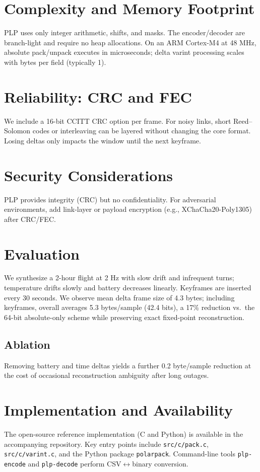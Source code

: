 \documentclass[conference]{IEEEtran}
\begin{document}
\section{Complexity and Memory Footprint}
PLP uses only integer arithmetic, shifts, and masks. The encoder/decoder are branch-light and require no heap allocations. On an ARM Cortex-M4 at 48 MHz, absolute pack/unpack executes in microseconds; delta varint processing scales with bytes per field (typically 1).
\section{Reliability: CRC and FEC}
We include a 16-bit CCITT CRC option per frame. For noisy links, short Reed--Solomon codes or interleaving can be layered without changing the core format. Losing deltas only impacts the window until the next keyframe.
\section{Security Considerations}
PLP provides integrity (CRC) but no confidentiality. For adversarial environments, add link-layer or payload encryption (e.g., XChaCha20-Poly1305) after CRC/FEC.
\section{Evaluation}
We synthesize a 2-hour flight at 2 Hz with slow drift and infrequent turns; temperature drifts slowly and battery decreases linearly. Keyframes are inserted every 30 seconds. We observe mean delta frame size of 4.3 bytes; including keyframes, overall averages 5.3 bytes/sample (42.4 bits), a 17\% reduction vs.\ the 64-bit absolute-only scheme while preserving exact fixed-point reconstruction.
\subsection{Ablation}
Removing battery and time deltas yields a further 0.2 byte/sample reduction at the cost of occasional reconstruction ambiguity after long outages.
\section{Implementation and Availability}
The open-source reference implementation (C and Python) is available in the accompanying repository. Key entry points include \texttt{src/c/pack.c}, \texttt{src/c/varint.c}, and the Python package \texttt{polarpack}. Command-line tools \texttt{plp-encode} and \texttt{plp-decode} perform CSV$\leftrightarrow$binary conversion.
\end{document}
